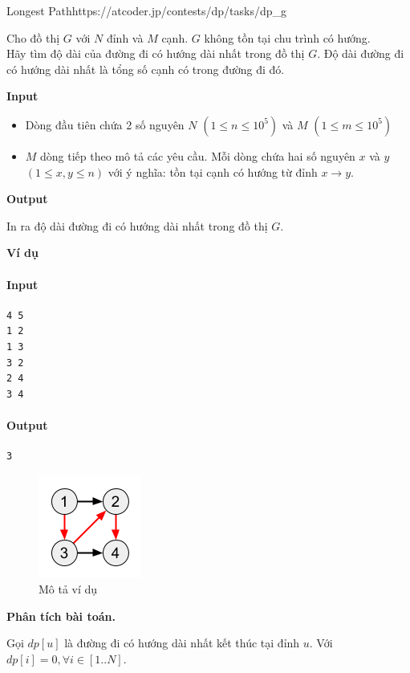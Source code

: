 \begin{baitap}{Longest Path}{https://atcoder.jp/contests/dp/tasks/dp\_g}

Cho đồ thị $G$ với $N$ đỉnh và $M$ cạnh. $G$ không tồn tại chu trình có hướng. \\

Hãy tìm độ dài của đường đi có hướng dài nhất trong đồ thị $G$. Độ dài đường đi có hướng dài nhất là tổng số cạnh có trong đường đi đó.

\textbf{Input}

\begin{itemize}
    \item Dòng đầu tiên chứa 2 số nguyên $N$ $(1 \leq n \leq 10^5)$ và $M$ $(1 \leq m \leq 10^5)$
    \item $M$ dòng tiếp theo mô tả các yêu cầu. Mỗi dòng chứa hai số nguyên $x$ và $y$ $(1 \leq x, y \leq n)$ với ý nghĩa: tồn tại cạnh có hướng từ đỉnh $x \rightarrow y$.
\end{itemize}

\textbf{Output}

In ra độ dài đường đi có hướng dài nhất trong đồ thị $G$.

\textbf{Ví dụ}
\paragraph{Input}
\begin{lstlisting}
4 5
1 2
1 3
3 2
2 4
3 4
\end{lstlisting}

\paragraph{Output}
\begin{lstlisting}
3
\end{lstlisting}

\begin{figure}[h]
    \centering
    \includegraphics[width=0.1 \textwidth]{resource/img/b2/longest_0_muffet.png}
    \caption{Mô tả ví dụ}    
\end{figure}

\end{baitap}

\textbf{Phân tích bài toán.}

Gọi $dp[u]$ là đường đi có hướng dài nhất kết thúc tại đỉnh $u$. Với $dp[i] = 0, \forall i \in [1..N]$. 

